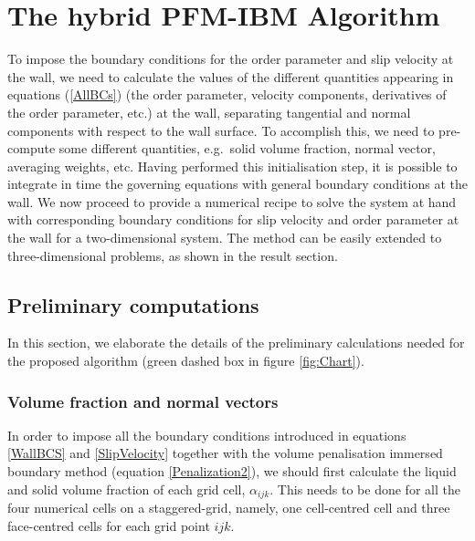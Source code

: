 \documentclass[review]{elsarticle}
\begin{document}
\section{The hybrid PFM-IBM Algorithm } \label{Sec:recipie}
To impose the boundary conditions for the order parameter and slip velocity at the wall, we need to calculate the values of the different quantities appearing in equations (\ref{AllBCs}) (the order parameter, velocity components, derivatives of the order parameter, etc.) at the wall, separating  tangential and normal components
with respect to the wall surface. To accomplish this, we need to pre-compute some different quantities, e.g.\ solid volume fraction, normal vector, averaging weights, etc. Having performed this initialisation step, it is possible to integrate in time the governing equations
with general boundary conditions at the wall. We now proceed to provide a numerical recipe to solve the system at hand  with corresponding boundary conditions for slip velocity and order parameter at the wall  for a two-dimensional system. The method can be easily extended to three-dimensional problems, as shown in the result section.

\subsection{Preliminary computations}
In this section, we elaborate the details of the preliminary calculations needed for the proposed algorithm (green dashed box in figure \ref{fig:Chart}).

\subsubsection{Volume fraction and normal vectors} \label{Sec:NormalVect}
In order to impose all the boundary conditions introduced in equations \ref{WallBCS} and \ref{SlipVelocity} together with the volume penalisation immersed boundary method (equation \ref{Penalization2}), we should first calculate the liquid and solid volume fraction of each grid cell, $\alpha_{ijk} $. This needs to be done for all the four numerical cells on a staggered-grid, namely, one cell-centred cell and three face-centred cells for each grid point $ijk$.
\end{document}

